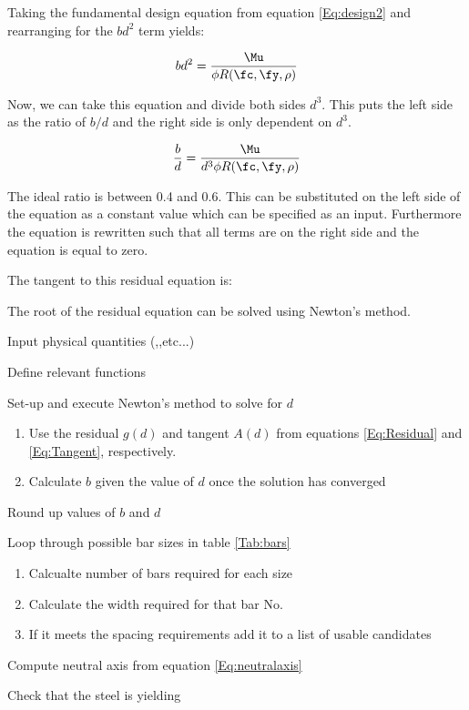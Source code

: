 Taking the fundamental design equation from equation \ref{Eq:design2} and rearranging for the $bd^2$ term yields:

\begin{align}
	bd^2=\frac{\Mu}{\phi R(\fc,\fy,\rho)}
\end{align}

Now, we can take this equation and divide both sides $d^3$. This puts the left side as the ratio of $b/d$ and the right side is only dependent on $d^3$.

\begin{align}
	\frac{b}{d}=\frac{\Mu}{d^3 \phi R(\fc,\fy,\rho)}
\end{align}

The ideal ratio is between 0.4 and 0.6. This can be substituted on the left side of the equation as a constant value which can be specified as an input. Furthermore the equation is rewritten such that all terms are on the right side and the equation is equal to zero.



The tangent to this residual equation is:


The root of the residual equation can be solved using Newton's method.


\begin{pseudocode}
 \item Input physical quantities (\fc,\fy,etc...)
 \item Define relevant functions
 \item Set-up and execute Newton's method to solve for $d$
 \begin{enumerate}
 	\item Use the residual $g(d)$ and tangent $A(d)$ from equations \ref{Eq:Residual} and \ref{Eq:Tangent}, respectively.
 	\item Calculate $b$ given the value of $d$ once the solution has converged
 \end{enumerate}
 
 \item Round up values of $b$ and $d$
	\item Loop through possible bar sizes in table \ref{Tab:bars}
	\begin{enumerate}
		\item Calcualte number of bars required for each size
		\item Calculate the width required for that bar No.
		\item If it meets the spacing requirements add it to a list of usable candidates
	\end{enumerate}

 \item Compute neutral axis from equation \ref{Eq:neutralaxis}
 \item Check that the steel is yielding
\end{pseudocode}
